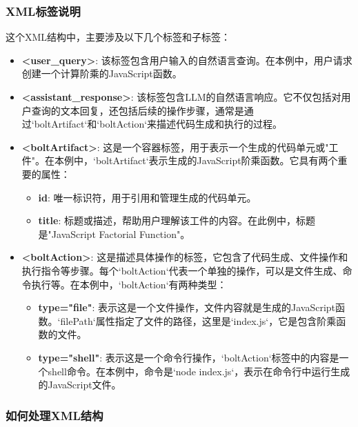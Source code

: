 \subsubsection{XML标签说明}

这个XML结构中，主要涉及以下几个标签和子标签：

\begin{itemize}
    \item \textbf{\textless user\_query\textgreater}: 该标签包含用户输入的自然语言查询。在本例中，用户请求创建一个计算阶乘的JavaScript函数。
    
    \item \textbf{\textless assistant\_response\textgreater}: 该标签包含LLM的自然语言响应。它不仅包括对用户查询的文本回复，还包括后续的操作步骤，通常是通过`boltArtifact`和`boltAction`来描述代码生成和执行的过程。
    
    \item \textbf{\textless boltArtifact\textgreater}: 这是一个容器标签，用于表示一个生成的代码单元或"工件"。在本例中，`boltArtifact`表示生成的JavaScript阶乘函数。它具有两个重要的属性：
    \begin{itemize}
        \item \textbf{id}: 唯一标识符，用于引用和管理生成的代码单元。
        \item \textbf{title}: 标题或描述，帮助用户理解该工件的内容。在此例中，标题是"JavaScript Factorial Function"。
    \end{itemize}
    
    \item \textbf{\textless boltAction\textgreater}: 这是描述具体操作的标签，它包含了代码生成、文件操作和执行指令等步骤。每个`boltAction`代表一个单独的操作，可以是文件生成、命令执行等。在本例中，`boltAction`有两种类型：
    \begin{itemize}
        \item \textbf{type="file"}: 表示这是一个文件操作，文件内容就是生成的JavaScript函数。`filePath`属性指定了文件的路径，这里是`index.js`，它是包含阶乘函数的文件。
        \item \textbf{type="shell"}: 表示这是一个命令行操作，`boltAction`标签中的内容是一个shell命令。在本例中，命令是`node index.js`，表示在命令行中运行生成的JavaScript文件。
    \end{itemize}
\end{itemize}

\subsubsection{如何处理XML结构}

